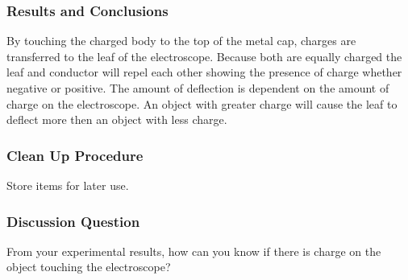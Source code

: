\subsubsection*{Results and Conclusions}
By touching the charged body to the top of the metal cap, charges are transferred to the leaf of the electroscope. Because both are equally charged the leaf and conductor will repel each other showing the presence of charge whether negative or positive.
The amount of deflection is dependent on the amount of charge on the electroscope. An object with greater charge will cause the leaf to deflect more then an object with less charge. 

\subsubsection*{Clean Up Procedure}
Store items for later use.

\subsubsection*{Discussion Question}
From your experimental results, how can you know if there is charge on the object touching the electroscope?






